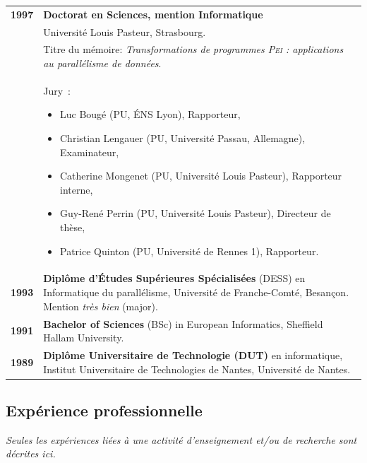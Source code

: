 \documentclass[11pt]{article}
\begin{document}
\begin{tabular}{lp{14.8cm}}
	\textbf{1997} & \textbf{Doctorat en Sciences, mention Informatique}\\
			  & Université Louis Pasteur, Strasbourg.\\
      		  & Titre du mémoire: {\em Transformations de programmes \textsc{Pei} : applications au parallélisme de données}.\\
		        & Jury~:
				\begin{small}
				\begin{itemize}
					\item Luc Bougé (PU, \'{E}NS Lyon), Rapporteur,
			    		\item Christian Lengauer (PU, Université Passau, Allemagne), Examinateur,
					\item Catherine Mongenet (PU, Université Louis Pasteur), Rapporteur interne,
					\item Guy-René Perrin (PU, Université Louis Pasteur), Directeur de thèse,
					\item Patrice Quinton (PU, Université de Rennes 1), Rapporteur.
				\end{itemize}
				\end{small}\\[2mm]
	\textbf{1993} &  \textbf{Diplôme d'\'{E}tudes Supérieures Spécialisées} (DESS) en Informatique du parallélisme, 
				  Université de Franche-Comté, Besançon. Mention {\em très bien} (major).\\[2mm]
	\textbf{1991} &  \textbf{Bachelor of Sciences} (BSc) in European Informatics, Sheffield Hallam University.\\[2mm]
	\textbf{1989} &  {\bf Diplôme Universitaire de Technologie (DUT)} en informatique, Institut Universitaire de 
					Technologies de Nantes, Université de Nantes.\\[5mm]

\end{tabular}



\subsection{Expérience professionnelle}

\textit{Seules les expériences liées à une activité d'enseignement et/ou de recherche sont décrites ici.}\\[2mm]
\end{document}
